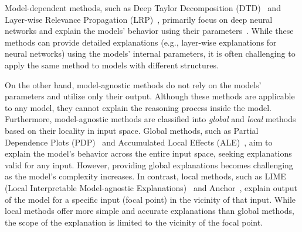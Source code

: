 \documentclass[11pt]{article}
\begin{document}
Model-dependent methods,
such as Deep Taylor Decomposition (DTD)~\cite{montavon2017explaining}
and Layer-wise Relevance Propagation (LRP)~\cite{bach2015pixel},
primarily focus on deep neural networks and
explain the models' behavior using their parameters~\cite{samek2021explaining}.
While these methods can provide detailed explanations
(e.g., layer-wise explanations for neural networks)
using the models' internal parameters,
it is often challenging
to apply the same method to models with different structures.

On the other hand,
model-agnostic methods
do not rely on the models' parameters and utilize only their output.
Although these methods are applicable to any model,
they cannot explain the reasoning process inside the model.
Furthermore, model-agnostic methods are classified into
\emph{global} and \emph{local} methods based on their locality in input space.
Global methods,
such as Partial Dependence Plots (PDP)~\cite{friedman2001greedy}
and Accumulated Local Effects (ALE)~\cite{apley2020visualizing},
aim to explain the model's behavior across the entire input space,
seeking explanations valid for any input.
However, providing global explanations becomes challenging
as the model's complexity increases.
In contrast, local methods,
such as LIME (Local Interpretable Model-agnostic Explanations)~\cite{ribeiro2016why}
and Anchor~\cite{ribeiro2018anchors},
explain output of the model for a specific input
(focal point) in the vicinity of that input.
While local methods offer more simple and accurate explanations
than global methods,
the scope of the explanation is limited to the vicinity of the focal point.
\end{document}
